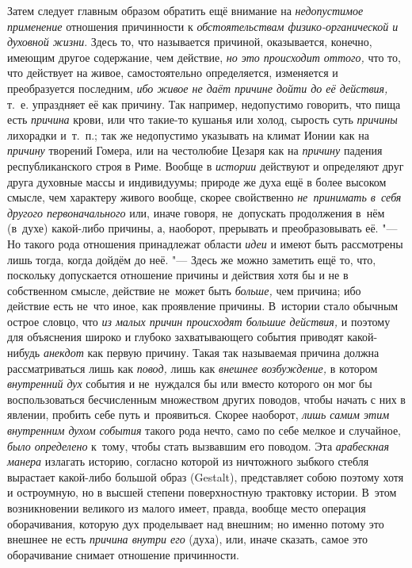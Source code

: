 Затем следует главным образом обратить ещё внимание на
{\em недопустимое применение} отношения причинности к
{\em обстоятельствам физико-органической и духовной жизни}. Здесь то, что
называется причиной, оказывается, конечно, имеющим другое содержание, чем
действие, {\em но это происходит оттого,} что то, что действует на живое,
самостоятельно определяется, изменяется и преобразуется последним,
{\em ибо живое не даёт причине дойти до её действия,} т.~е. упраздняет её как
причину. Так например, недопустимо говорить, что пища есть {\em причина} крови,
или что такие-то кушанья или холод, сырость суть {\em причины} лихорадки
и~т.~п.; так же недопустимо указывать на климат Ионии как на {\em причину}
творений Гомера, или на честолюбие Цезаря как на {\em причину} падения
республиканского строя в Риме. Вообще в {\em истории} действуют и определяют
друг друга духовные массы и индивидуумы; природе же духа ещё в более высоком
смысле, чем характеру живого вообще, скорее свойственно
{\em не~принимать в~себя другого первоначального} или, иначе говоря,
не~допускать продолжения в~нём (в~духе) какой-либо причины, а, наоборот,
прерывать и преобразовывать её. "--- Но такого рода отношения принадлежат
области {\em идеи} и имеют быть рассмотрены лишь тогда, когда дойдём до неё.
"--- Здесь же можно заметить ещё то, что, поскольку допускается отношение
причины и действия хотя бы и не в собственном смысле, действие не~может быть
{\em больше,} чем причина; ибо действие есть не~что иное, как проявление
причины. В~истории стало обычным острое словцо, что {\em из малых причин
происходят большие действия,} и поэтому для объяснения широко и глубоко
захватывающего события приводят какой-нибудь {\em анекдот} как первую причину.
Такая так называемая причина должна рассматриваться лишь как {\em повод,} лишь
как {\em внешнее возбуждение,} в котором {\em внутренний дух} события и
не~нуждался бы или вместо которого он мог бы воспользоваться бесчисленным
множеством других поводов, чтобы начать с них в явлении, пробить себе путь
и~проявиться. Скорее наоборот, {\em лишь самим этим внутренним духом события}
такого рода нечто, само по себе мелкое и случайное, {\em было определено}
к~тому, чтобы стать вызвавшим его поводом. Эта {\em арабескная манера} излагать
историю, согласно которой из ничтожного зыбкого стебля вырастает какой-либо
большой образ (Gestalt), представляет собою поэтому хотя и остроумную, но в
высшей степени поверхностную трактовку истории. В~этом возникновении великого
из малого имеет, правда, вообще место операция оборачивания, которую дух
проделывает над внешним; но именно потому это внешнее не есть
{\em причина внутри его} (духа), или, иначе сказать, самое это оборачивание
снимает отношение причинности.

